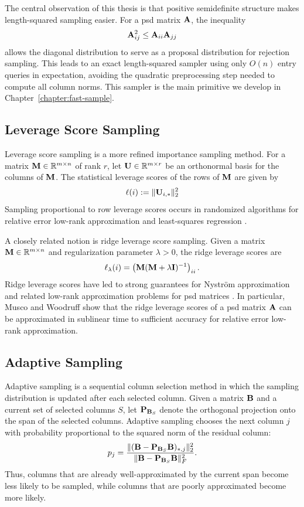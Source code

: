 The central observation of this thesis is that positive semidefinite structure makes length-squared sampling easier. For a psd matrix $\mathbf{A}$, the inequality
\[
    \mathbf{A}_{ij}^2 \leq \mathbf{A}_{ii}\mathbf{A}_{jj}
\]
allows the diagonal distribution to serve as a proposal distribution for rejection sampling. This leads to an exact length-squared sampler using only $O(n)$ entry queries in expectation, avoiding the quadratic preprocessing step needed to compute all column norms. This sampler is the main primitive we develop in Chapter~\ref{chapter:fast-sample}.

\subsection{Leverage Score Sampling}

Leverage score sampling is a more refined importance sampling method. For a matrix $\mathbf{M}\in\mathbb{R}^{m\times n}$ of rank $r$, let $\mathbf{U}\in\mathbb{R}^{m\times r}$ be an orthonormal basis for the columns of $\mathbf{M}$. The statistical leverage scores of the rows of $\mathbf{M}$ are given by
\[\ell(i) := \|\mathbf{U}_{i, *}\|^2_2\]
Sampling proportional to row leverage scores occurs in randomized algorithms for relative error low-rank approximation \cite{drineas_relative-error_2007} and least-squares regression \cite{drineas_faster_2007}.

A closely related notion is ridge leverage score sampling. Given a matrix $\mathbf{M}\in\mathbb{R}^{m\times n}$ and regularization parameter $\lambda>0$, the ridge leverage scores are
\[
    \ell_\lambda(i)
    =
    \left(\mathbf{M}(\mathbf{M}+\lambda\mathbf{I})^{-1}\right)_{ii}.
\]
Ridge leverage scores have led to strong guarantees for Nystr\"om approximation and related low-rank approximation problems for psd matrices \cite{musco_recursive_2017, clarkson_low-rank_2017, musco_sublinear_2019}. In particular, Musco and Woodruff \cite{musco_sublinear_2019} show that the ridge leverage scores of a psd matrix $\mathbf{A}$ can be approximated in sublinear time to sufficient accuracy for relative error low-rank approximation.

\subsection{Adaptive Sampling}

Adaptive sampling is a sequential column selection method in which the sampling distribution is updated after each selected column. Given a matrix $\mathbf{B}$ and a current set of selected columns $S$, let $\mathbf{P}_{\mathbf{B}_S}$ denote the orthogonal projection onto the span of the selected columns. Adaptive sampling chooses the next column $j$ with probability proportional to the squared norm of the residual column:
\[
    p_j
    =
    \frac{\|(\mathbf{B}-\mathbf{P}_{\mathbf{B}_S}\mathbf{B})_{*,j}\|_2^2}
         {\|\mathbf{B}-\mathbf{P}_{\mathbf{B}_S}\mathbf{B}\|_F^2}.
\]
Thus, columns that are already well-approximated by the current span become less likely to be sampled, while columns that are poorly approximated become more likely. 

